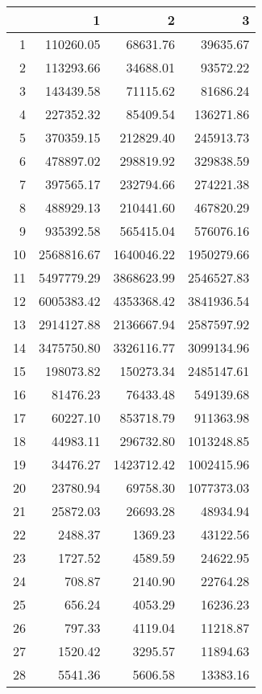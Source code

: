 \begin{table}[ht]
\centering
\begin{tabular}{rrrr}
  \hline
 & 1 & 2 & 3 \\ 
  \hline
1 & 110260.05 & 68631.76 & 39635.67 \\ 
  2 & 113293.66 & 34688.01 & 93572.22 \\ 
  3 & 143439.58 & 71115.62 & 81686.24 \\ 
  4 & 227352.32 & 85409.54 & 136271.86 \\ 
  5 & 370359.15 & 212829.40 & 245913.73 \\ 
  6 & 478897.02 & 298819.92 & 329838.59 \\ 
  7 & 397565.17 & 232794.66 & 274221.38 \\ 
  8 & 488929.13 & 210441.60 & 467820.29 \\ 
  9 & 935392.58 & 565415.04 & 576076.16 \\ 
  10 & 2568816.67 & 1640046.22 & 1950279.66 \\ 
  11 & 5497779.29 & 3868623.99 & 2546527.83 \\ 
  12 & 6005383.42 & 4353368.42 & 3841936.54 \\ 
  13 & 2914127.88 & 2136667.94 & 2587597.92 \\ 
  14 & 3475750.80 & 3326116.77 & 3099134.96 \\ 
  15 & 198073.82 & 150273.34 & 2485147.61 \\ 
  16 & 81476.23 & 76433.48 & 549139.68 \\ 
  17 & 60227.10 & 853718.79 & 911363.98 \\ 
  18 & 44983.11 & 296732.80 & 1013248.85 \\ 
  19 & 34476.27 & 1423712.42 & 1002415.96 \\ 
  20 & 23780.94 & 69758.30 & 1077373.03 \\ 
  21 & 25872.03 & 26693.28 & 48934.94 \\ 
  22 & 2488.37 & 1369.23 & 43122.56 \\ 
  23 & 1727.52 & 4589.59 & 24622.95 \\ 
  24 & 708.87 & 2140.90 & 22764.28 \\ 
  25 & 656.24 & 4053.29 & 16236.23 \\ 
  26 & 797.33 & 4119.04 & 11218.87 \\ 
  27 & 1520.42 & 3295.57 & 11894.63 \\ 
  28 & 5541.36 & 5606.58 & 13383.16 \\ 

\end{tabular}
\end{table}
